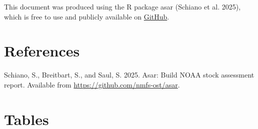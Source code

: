 \documentclass[
  letterpaper,
]{article}
\newlength{\cslhangindent}
\newenvironment{CSLReferences}[2] %
 {\begin{list}{}{%
  \setlength{\itemindent}{0pt}
  \setlength{\leftmargin}{0pt}
  \setlength{\parsep}{0pt}
  \ifodd #1
   \setlength{\leftmargin}{\cslhangindent}
   \setlength{\itemindent}{-1\cslhangindent}
  \fi
  \setlength{\itemsep}{#2\baselineskip}}}
 {\end{list}}
\begin{document}
This document was produced using the R package asar (Schiano et al.
2025), which is free to use and publicly available on
\href{https://github.com/nmfs-ost/asar}{GitHub}.

\newpage{}

\section{References}\label{sec-refs}

\label{refs}
\begin{CSLReferences}{1}{0}
Schiano, S., Breitbart, S., and Saul, S. 2025. Asar: Build NOAA stock
assessment report. Available from
\url{https://github.com/nmfs-ost/asar}.

\end{CSLReferences}

\newpage{}

\section{Tables}\label{sec-tables}
\end{document}
